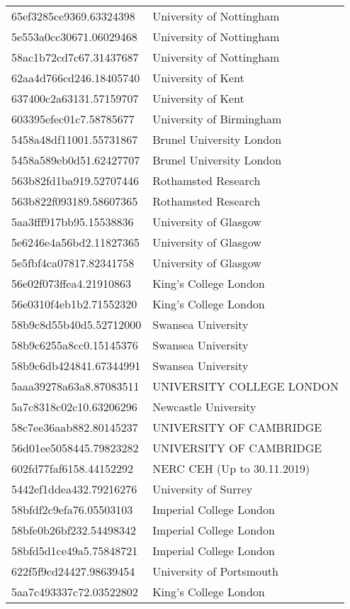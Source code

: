 \begin{tabular}{ll}
65ef3285ce9369.63324398 & University of Nottingham \\
5e553a0cc30671.06029468 & University of Nottingham \\
58ac1b72cd7c67.31437687 & University of Nottingham \\
62aa4d766cd246.18405740 & University of Kent \\
637400c2a63131.57159707 & University of Kent \\
603395efec01c7.58785677 & University of Birmingham \\
5458a48df11001.55731867 & Brunel University London \\
5458a589eb0d51.62427707 & Brunel University London \\
563b82fd1ba919.52707446 & Rothamsted Research \\
563b822f093189.58607365 & Rothamsted Research \\
5aa3fff917bb95.15538836 & University of Glasgow \\
5e6246e4a56bd2.11827365 & University of Glasgow \\
5e5fbf4ca07817.82341758 & University of Glasgow \\
56e02f073ffea4.21910863 & King's College London \\
56e0310f4eb1b2.71552320 & King's College London \\
58b9c8d55b40d5.52712000 & Swansea University \\
58b9c6255a8cc0.15145376 & Swansea University \\
58b9c6db424841.67344991 & Swansea University \\
5aaa39278a63a8.87083511 & UNIVERSITY COLLEGE LONDON \\
5a7c8318c02c10.63206296 & Newcastle University \\
58c7ee36aab882.80145237 & UNIVERSITY OF CAMBRIDGE \\
56d01ee5058445.79823282 & UNIVERSITY OF CAMBRIDGE \\
602fd77faf6158.44152292 & NERC CEH (Up to 30.11.2019) \\
5442ef1ddea432.79216276 & University of Surrey \\
58bfdf2c9efa76.05503103 & Imperial College London \\
58bfe0b26bf232.54498342 & Imperial College London \\
58bfd5d1ce49a5.75848721 & Imperial College London \\
622f5f9cd24427.98639454 & University of Portsmouth \\
5aa7c493337c72.03522802 & King's College London \\

\end{tabular}
